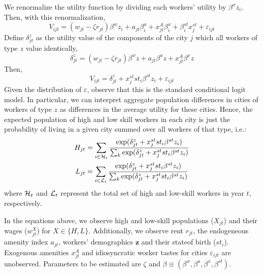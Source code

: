 \documentclass{article}
\begin{document}
We renormalize the utility function by dividing each workers' utility by $\beta^\sigma z_i$. Then, with this renormalization,
$$V_{ijt} = (w_{jt}-\zeta r_{jt})\beta^w z_i + a_{jt}\beta_i^a + x_{jt}^A\beta_i^x + \beta_i^{st}x_{j}^{st} + \varepsilon_{ijt}$$ %
Define $\delta_{jt}^z$ as the utility value of the components of the city $j$ which all workers of type $z$ value identically,
$$\delta_{jt}^z = (w_{jt} - \zeta r_{jt})\beta^w z + a_{jt}\beta^a z + x_{jt}^A\beta^xz$$
Then,
$$V_{ijt} = \delta_{jt}^z + x_j^{st}st_i\beta^{st}z_i + \varepsilon_{ijt}$$
Given the distribution of $\varepsilon$, observe that this is the standard conditional logit model. In particular, we can interpret aggregate population differences in cities of workers of type $z$ as differences in the average utility for these cities. Hence, the expected population of high and low skill workers in each city is just the probability of living in a given city summed over all workers of that type, i.e.: 
\begin{align}
H_{jt} &= \sum_{i\in\mathcal{H}_t} \frac{\exp(\delta_{jt}^z + x_j^{st}st_i\beta^{st}z_i)}{\sum_{k} \exp(\delta_{jt}^z + x_j^{st}st_i\beta^{st}z_i)} \\
L_{jt} &= \sum_{i\in\mathcal{L}_t} \frac{\exp(\delta_{jt}^z + x_j^{st}st_i\beta^{st}z_i)}{\sum_{k} \exp(\delta_{jt}^z + x_j^{st}st_i\beta^{st}z_i)}
\end{align}
where $\mathcal{H}_t$ and $\mathcal{L}_t$ represent the total set of high and low-skill workers in year $t$, respectively.

In the equations above, we observe high and low-skill populations ($X_{jt}$) and their wages ($w_{jt}^X$) for $X \in \{H, L\}$. Additionally, we observe rent $r_{jt}$, the endogeneous amenity index $a_{jt}$, workers' demographics $\bm{z}$ and their stateof birth ($st_i$). Exogenous amenities $x_{jt}^A$ and idiosyncratic worker tastes for cities $\varepsilon_{ijt}$ are unobserved. Parameters to be estimated are $\zeta$ and $\beta \equiv (\beta^w, \beta^a, \beta^x, \beta^{st})$.
\end{document}
